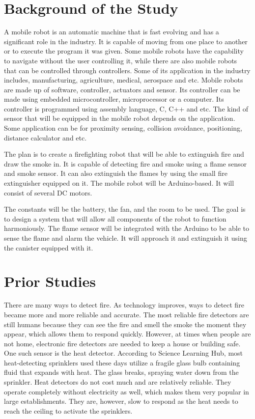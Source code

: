 \section{Background of the Study}
	
	A mobile robot is an automatic machine that is fast evolving and has a significant role in the industry. It is capable of moving from one place to another or to execute the program it was given. Some mobile robots have the capability to navigate without the user controlling it, while there are also mobile robots that can be controlled through controllers. Some of its application in the industry includes, manufacturing, agriculture, medical, aerospace and etc. Mobile robots are made up of software, controller, actuators and sensor. Its controller can be made using embedded microcontroller, microprocessor or a computer. Its controller is programmed using assembly language, C, C++ and etc. The kind of sensor that will be equipped in the mobile robot depends on the application. Some application can be for proximity sensing, collision avoidance, positioning, distance calculator and etc. 
	
	The plan is to create a firefighting robot that will be able to extinguish fire and draw the smoke in. It is capable of detecting fire and smoke using a flame sensor and smoke sensor. It can also extinguish the flames by using the small fire extinguisher equipped on it. The mobile robot will be Arduino-based. It will consist of several DC motors.

	The constants will be the battery, the fan, and the room to be used. The goal is to design a system that will allow all components of the robot to function harmoniously. The flame sensor will be integrated with the Arduino to be able to sense the flame and alarm the vehicle. It will approach it and extinguish it using the canister equipped with it.


\section{Prior Studies}

	
	There are many ways to detect fire. As technology improves, ways to detect fire became more and more reliable and accurate. The most reliable fire detectors are still humans because they can see the fire and smell the smoke the moment they appear, which allows them to respond quickly. However, at times when people are not home, electronic fire detectors are needed to keep a house or building safe. One such sensor is the heat detector. According to Science Learning Hub, most heat-detecting sprinklers used these days utilize a fragile glass bulb containing fluid that expands with heat. The glass breaks, spraying water down from the sprinkler. Heat detectors do not cost much and are relatively reliable. They operate completely without electricity as well, which makes them very popular in large establishments. They are, however, slow to respond as the heat needs to reach the ceiling to activate the sprinklers.


